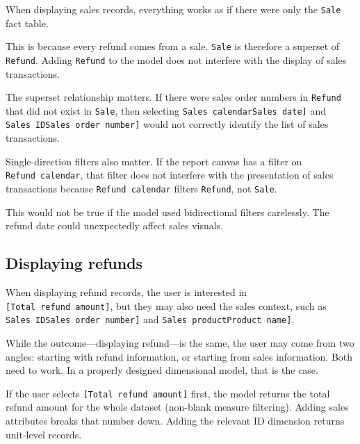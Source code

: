 \documentclass[10pt,openany,10pt]{book}
\begin{document}
When displaying sales records, everything works as if there were only
the \texttt{\textquotesingle{}Sale\textquotesingle{}} fact table.

This is because every refund comes from a sale.
\texttt{\textquotesingle{}Sale\textquotesingle{}} is therefore a
superset of \texttt{\textquotesingle{}Refund\textquotesingle{}}. Adding
\texttt{\textquotesingle{}Refund\textquotesingle{}} to the model does
not interfere with the display of sales transactions.

The superset relationship matters. If there were sales order numbers in
\texttt{\textquotesingle{}Refund\textquotesingle{}} that did not exist
in \texttt{\textquotesingle{}Sale\textquotesingle{}}, then selecting
\texttt{\textquotesingle{}Sales\ calendar\textquotesingle{}{[}Sales\ date{]}}
and
\texttt{\textquotesingle{}Sales\ ID\textquotesingle{}{[}Sales\ order\ number{]}}
would not correctly identify the list of sales transactions.

Single-direction filters also matter. If the report canvas has a filter
on \texttt{\textquotesingle{}Refund\ calendar\textquotesingle{}}, that
filter does not interfere with the presentation of sales transactions
because \texttt{\textquotesingle{}Refund\ calendar\textquotesingle{}}
filters \texttt{\textquotesingle{}Refund\textquotesingle{}}, not
\texttt{\textquotesingle{}Sale\textquotesingle{}}.

This would not be true if the model used bidirectional filters
carelessly. The refund date could unexpectedly affect sales visuals.

\subsection{Displaying refunds}\label{displaying-refunds}

When displaying refund records, the user is interested in
\texttt{{[}Total\ refund\ amount{]}}, but they may also need the sales
context, such as
\texttt{\textquotesingle{}Sales\ ID\textquotesingle{}{[}Sales\ order\ number{]}}
and
\texttt{\textquotesingle{}Sales\ product\textquotesingle{}{[}Product\ name{]}}.

While the outcome---displaying refund---is the same, the user may come
from two angles: starting with refund information, or starting from
sales information. Both need to work. In a properly designed dimensional
model, that is the case.

If the user selects \texttt{{[}Total\ refund\ amount{]}} first, the
model returns the total refund amount for the whole dataset (non-blank
measure filtering). Adding sales attributes breaks that number down.
Adding the relevant ID dimension returns unit-level records.
\end{document}
